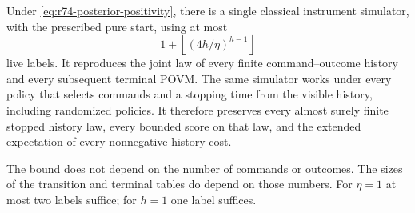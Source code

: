 \begin{theorem}
\label{thm:r74-instrument}
Under \eqref{eq:r74-posterior-positivity}, there is a single classical
instrument simulator, with the prescribed pure start, using at most
\begin{equation}\label{eq:r74-instrument-bound}
 1+\left\lfloor(4h/\eta)^{h-1}\right\rfloor
\end{equation}
live labels. It reproduces the joint law of every finite command--outcome
history and every subsequent terminal POVM. The same simulator works under
every policy that selects commands and a stopping time from the visible
history, including randomized policies. It therefore preserves every
almost surely finite stopped history law, every bounded score on that law,
and the extended expectation of every nonnegative history cost.

The bound does not depend on the number of commands or outcomes. The sizes
of the transition and terminal tables do depend on those numbers. For
$\eta=1$ at most two labels suffice; for $h=1$ one label suffices.
\end{theorem}
